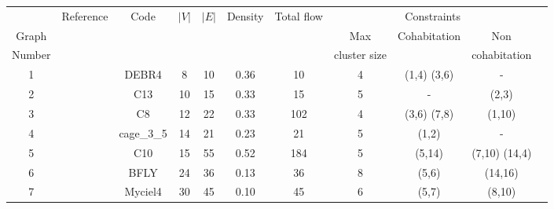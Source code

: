 \begin{landscape}
\renewcommand{\arraystretch}{1}
\begin{center}
\begin{table}[H]
\tiny
\begin{tabular}{ccc cc cc c c c c}
\hline
 & \multirow{3}{*}{Reference} & \multirow{3}{*}{Code} & \multirow{3}{*}{$|V|$} & \multirow{3}{*}{$|E|$}  &  \multirow{3}{*}{Density}  & \multirow{3}{*}{Total flow}  & \multicolumn{3}{c}{Constraints} \\
\cline{8-10}
Graph  & • & • & • & • & • & • & Max          & Cohabitation & Non  \\
Number & • & • & • & • & • & • & cluster size &    &cohabitation\\
\hline 
1	& \citep{dimacs10}	& DEBR4	 & 8 &  10  & 0.36 					& 10    &  4  &  (1,4)  (3,6) &         -														\\
2	& \citep{merchichi2015constraint}	& C13  & 10 &  15  & 0.33 	& 15    &  5  & - &    (2,3)  													\\
3	& \citep{merchichi2015constraint} & C8 & 12 &  22  & 0.33 		& 102   &  4  &  (3,6)  (7,8) &  (1,10) 												\\
4	& \citep{dimacs10}	& cage\_3\_5  & 14 &  21  & 0.23 			&  21   &  5  &  (1,2) &  -  																\\
5	& \citep{merchichi2015constraint}& C10	 & 15 &  55 & 0.52 		& 184   &  5  &  (5,14) & (7,10) (14,4)												\\
6	& \citep{dimacs10}	& BFLY & 24 &  36  & 0.13 					& 36    &  8  &  (5,6) & (14,16) 																	\\
7	& \citep{chrisWalshaw}	& Myciel4 & 30 &  45  & 0.10 			& 45    &  6  &  (5,7) & (8,10) 									 						\\


\end{tabular}
\end{table}
\end{center}
\end{landscape}
